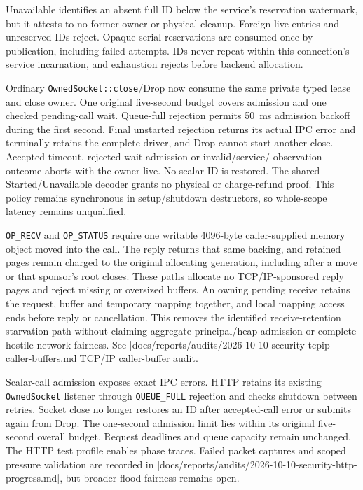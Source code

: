 Unavailable identifies an absent full ID below the service's
reservation watermark, but it attests to no former owner or physical cleanup.
Foreign live entries and unreserved IDs reject. Opaque serial reservations are
consumed once by publication, including failed attempts. IDs never repeat within
this connection's service incarnation, and exhaustion rejects before backend
allocation.

Ordinary \texttt{OwnedSocket::close}/Drop now consume the same
private typed lease and close owner. One original five-second budget covers
admission and one checked pending-call wait. Queue-full rejection permits 50~ms
admission backoff during the first second. Final unstarted rejection returns its
actual IPC error and terminally retains the complete driver, and Drop cannot start
another close. Accepted timeout, rejected wait admission or invalid/service/
observation outcome aborts with the owner live. No scalar ID is restored.
The shared Started/Unavailable decoder grants no physical or charge-refund proof.
This policy remains synchronous in setup/shutdown destructors, so whole-scope
latency remains unqualified.

\texttt{OP\_RECV} and \texttt{OP\_STATUS} require one writable 4096-byte
caller-supplied memory object moved into the call. The reply returns that same
backing, and retained pages remain charged to the original allocating generation,
including after a move or that sponsor's root closes. These paths allocate no
TCP/IP-sponsored reply pages and reject missing or oversized buffers. An owning
pending receive retains the request, buffer and temporary mapping together, and
local mapping access ends before reply or cancellation. This removes the
identified receive-retention starvation path without claiming aggregate
principal/heap admission or complete hostile-network fairness. See
\repofiletext|docs/reports/audits/2026-10-10-security-tcpip-caller-buffers.md|{TCP/IP caller-buffer audit}.

Scalar-call admission exposes exact IPC errors. HTTP retains its existing
\texttt{OwnedSocket} listener through \texttt{QUEUE\_FULL} rejection and
checks shutdown between retries. Socket close no longer restores an ID after
accepted-call error or submits again from Drop. The one-second admission limit
lies within its original five-second overall budget. Request deadlines and
queue capacity remain unchanged. The HTTP test profile enables phase traces. Failed packet captures
and scoped pressure validation are recorded in
\repofile|docs/reports/audits/2026-10-10-security-http-progress.md|, but
broader flood fairness remains open.


